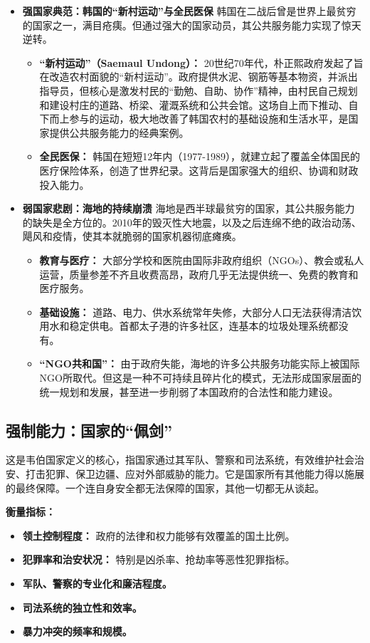 \begin{itemize}
    \item \textbf{强国家典范：韩国的“新村运动”与全民医保}
    韩国在二战后曾是世界上最贫穷的国家之一，满目疮痍。但通过强大的国家动员，其公共服务能力实现了惊天逆转。
    \begin{itemize}
        \item \textbf{“新村运动”（Saemaul Undong）：} 20世纪70年代，朴正熙政府发起了旨在改造农村面貌的“新村运动”。政府提供水泥、钢筋等基本物资，并派出指导员，但核心是激发村民的“勤勉、自助、协作”精神，由村民自己规划和建设村庄的道路、桥梁、灌溉系统和公共会馆。这场自上而下推动、自下而上参与的运动，极大地改善了韩国农村的基础设施和生活水平，是国家提供公共服务能力的经典案例。
        \item \textbf{全民医保：} 韩国在短短12年内（1977-1989），就建立起了覆盖全体国民的医疗保险体系，创造了世界纪录。这背后是国家强大的组织、协调和财政投入能力。
    \end{itemize}
    \item \textbf{弱国家悲剧：海地的持续崩溃}
    海地是西半球最贫穷的国家，其公共服务能力的缺失是全方位的。2010年的毁灭性大地震，以及之后连绵不绝的政治动荡、飓风和疫情，使其本就脆弱的国家机器彻底瘫痪。
    \begin{itemize}
        \item \textbf{教育与医疗：} 大部分学校和医院由国际非政府组织（NGOs）、教会或私人运营，质量参差不齐且收费高昂，政府几乎无法提供统一、免费的教育和医疗服务。
        \item \textbf{基础设施：} 道路、电力、供水系统常年失修，大部分人口无法获得清洁饮用水和稳定供电。首都太子港的许多社区，连基本的垃圾处理系统都没有。
        \item \textbf{“NGO共和国”：} 由于政府失能，海地的许多公共服务功能实际上被国际NGO所取代。但这是一种不可持续且碎片化的模式，无法形成国家层面的统一规划和发展，甚至进一步削弱了本国政府的合法性和能力建设。
    \end{itemize}
\end{itemize}

\subsection{强制能力：国家的“佩剑”}

这是韦伯国家定义的核心，指国家通过其军队、警察和司法系统，有效维护社会治安、打击犯罪、保卫边疆、应对外部威胁的能力。它是国家所有其他能力得以施展的最终保障。一个连自身安全都无法保障的国家，其他一切都无从谈起。

\textbf{衡量指标：}
\begin{itemize}
    \item \textbf{领土控制程度：} 政府的法律和权力能够有效覆盖的国土比例。
    \item \textbf{犯罪率和治安状况：} 特别是凶杀率、抢劫率等恶性犯罪指标。
    \item \textbf{军队、警察的专业化和廉洁程度。}
    \item \textbf{司法系统的独立性和效率。}
    \item \textbf{暴力冲突的频率和规模。}
\end{itemize}

